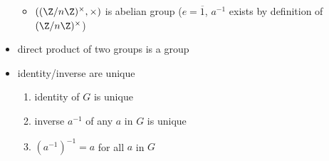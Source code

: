 \documentclass[11pt]{article}
\begin{document}
\begin{definition*}
\begin{itemize}
\begin{itemize}
            \item $(\integermodnmul, \times)$ is abelian group ($e = \overline{1}$, $a^{-1}$ exists by definition of $\integermodnmul$)
        \end{itemize}
        \item {} direct product of two groups is a group
        \item {} identity/inverse are unique
        \begin{enumerate}
            \item identity of $G$ is unique
            \item inverse $a^{-1}$ of any $a$ in $G$ is unique
            \item $(a^{-1})^{-1} = a$ for all $a$ in $G$
        \end{enumerate}
    \end{itemize}
\end{definition*}
\end{document}
